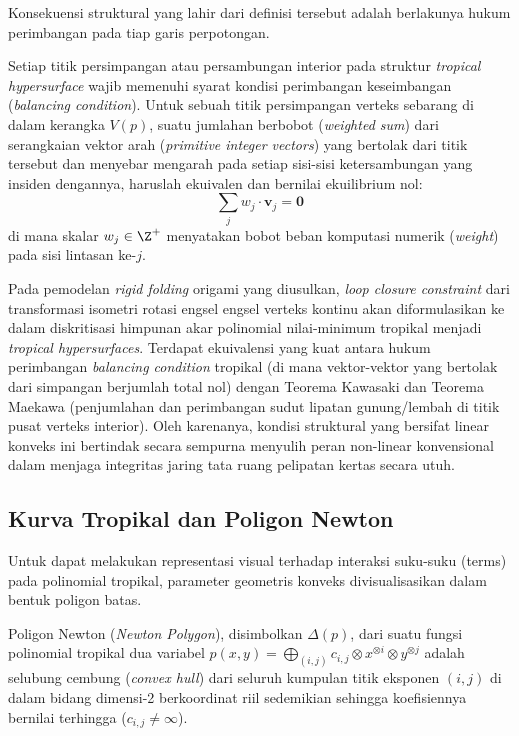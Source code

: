 Konsekuensi struktural yang lahir dari definisi tersebut adalah berlakunya hukum perimbangan pada tiap garis perpotongan.
\begin{teorema}
  Setiap titik persimpangan atau persambungan interior pada struktur \textit{tropical hypersurface} wajib memenuhi syarat kondisi perimbangan keseimbangan (\textit{balancing condition}). Untuk sebuah titik persimpangan verteks sebarang di dalam kerangka $V(p)$, suatu jumlahan berbobot (\textit{weighted sum}) dari serangkaian vektor arah (\textit{primitive integer vectors}) yang bertolak dari titik tersebut dan menyebar mengarah pada setiap sisi-sisi ketersambungan yang insiden dengannya, haruslah ekuivalen dan bernilai ekuilibrium nol:
  \[
    \sum_{j} w_j \cdot \mathbf{v}_j = \mathbf{0}
  \]
  di mana skalar $w_j \in \Z^+$ menyatakan bobot beban komputasi numerik (\textit{weight}) pada sisi lintasan ke-$j$.
\end{teorema}

Pada pemodelan \textit{rigid folding} origami yang diusulkan, \textit{loop closure constraint} dari transformasi isometri rotasi engsel engsel verteks kontinu akan diformulasikan ke dalam diskritisasi himpunan akar polinomial nilai-minimum tropikal menjadi \textit{tropical hypersurfaces}. Terdapat ekuivalensi yang kuat antara hukum perimbangan \textit{balancing condition} tropikal (di mana vektor-vektor yang bertolak dari simpangan berjumlah total nol) dengan Teorema Kawasaki dan Teorema Maekawa (penjumlahan dan perimbangan sudut lipatan gunung/lembah di titik pusat verteks interior). Oleh karenanya, kondisi struktural yang bersifat linear konveks ini bertindak secara sempurna menyulih peran non-linear konvensional dalam menjaga integritas jaring tata ruang pelipatan kertas secara utuh.

\subsection{Kurva Tropikal dan Poligon Newton}
Untuk dapat melakukan representasi visual terhadap interaksi suku-suku (terms) pada polinomial tropikal, parameter geometris konveks divisualisasikan dalam bentuk poligon batas.
\begin{definisi}
  Poligon Newton (\textit{Newton Polygon}), disimbolkan $\Delta(p)$, dari suatu fungsi polinomial tropikal dua variabel $p(x, y) = \bigoplus_{(i,j)} c_{i,j} \otimes x^{\otimes i} \otimes y^{\otimes j}$ adalah selubung cembung (\textit{convex hull}) dari seluruh kumpulan titik eksponen $(i,j)$ di dalam bidang dimensi-2 berkoordinat riil sedemikian sehingga koefisiennya bernilai terhingga ($c_{i,j} \ne \infty$).
\end{definisi}


